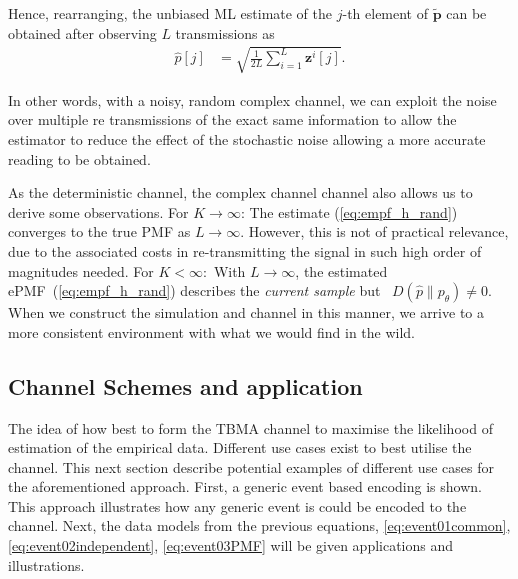\documentclass{article}
\begin{document}
Hence, rearranging, the unbiased ML estimate of the $j$-th element of $\tilde{\boldsymbol{p}}$ can be obtained after observing $L$ transmissions as
%
\begin{align}
    \hat{p}[j] &= \sqrt{\frac{1}{2L} \sum_{i = 1}^{L}\boldsymbol{z}^i[j]}.\label{eq:empf_h_rand}
\end{align}

In other words, with a noisy, random complex channel, we can exploit the noise over multiple re transmissions of the exact same information to allow the estimator to reduce the effect of the stochastic noise allowing a more accurate reading to be obtained. 

As the deterministic channel, the complex channel channel also allows us to derive some observations. For $K \rightarrow \infty$: The estimate (\ref{eq:empf_h_rand}) converges to the true PMF as $L \rightarrow \infty$. However, this is not of practical relevance, due to the associated costs in re-transmitting the signal in such high order of magnitudes needed. For $K <\infty:$ With $L \rightarrow \infty$, the estimated ePMF~(\ref{eq:empf_h_rand}) describes the \emph{current sample} but ~$D(\hat{p}\| p_{\theta}) \neq 0$. When we construct the simulation and channel in this manner, we arrive to a more consistent environment with what we would find in the wild.

\subsection{Channel Schemes and application} \label{schemas_and_channels}
The idea of how best to form the TBMA channel to maximise the likelihood of estimation of the empirical data. Different use cases exist to best utilise the channel. This next section describe potential examples of different use cases for the aforementioned approach. First, a generic event based encoding is shown. This approach illustrates how any generic event is could be encoded to the channel. Next, the data models from the previous equations, \ref{eq:event01common},\ref{eq:event02independent}, \ref{eq:event03PMF} will be given applications and illustrations.  
\end{document}
